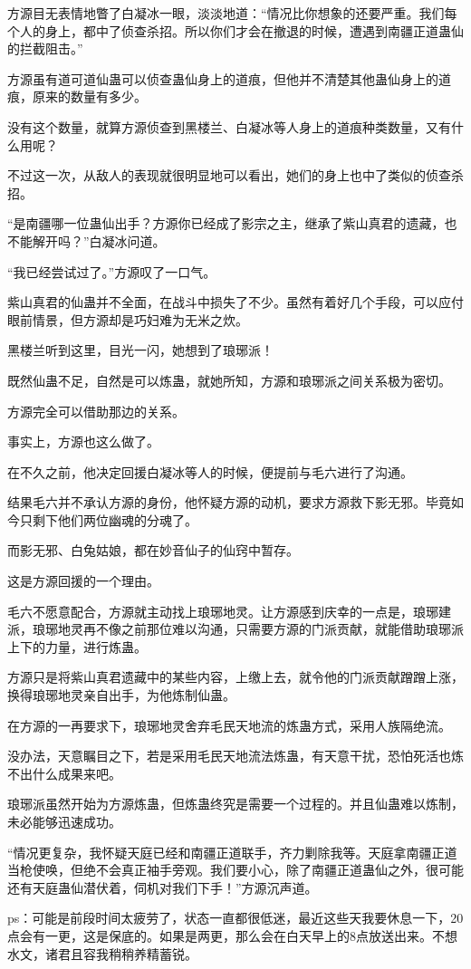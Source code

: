 \begin{this_body}
方源目无表情地瞥了白凝冰一眼，淡淡地道：“情况比你想象的还要严重。我们每个人的身上，都中了侦查杀招。所以你们才会在撤退的时候，遭遇到南疆正道蛊仙的拦截阻击。”

方源虽有道可道仙蛊可以侦查蛊仙身上的道痕，但他并不清楚其他蛊仙身上的道痕，原来的数量有多少。

没有这个数量，就算方源侦查到黑楼兰、白凝冰等人身上的道痕种类数量，又有什么用呢？

不过这一次，从敌人的表现就很明显地可以看出，她们的身上也中了类似的侦查杀招。

“是南疆哪一位蛊仙出手？方源你已经成了影宗之主，继承了紫山真君的遗藏，也不能解开吗？”白凝冰问道。

“我已经尝试过了。”方源叹了一口气。

紫山真君的仙蛊并不全面，在战斗中损失了不少。虽然有着好几个手段，可以应付眼前情景，但方源却是巧妇难为无米之炊。

黑楼兰听到这里，目光一闪，她想到了琅琊派！

既然仙蛊不足，自然是可以炼蛊，就她所知，方源和琅琊派之间关系极为密切。

方源完全可以借助那边的关系。

事实上，方源也这么做了。

在不久之前，他决定回援白凝冰等人的时候，便提前与毛六进行了沟通。

结果毛六并不承认方源的身份，他怀疑方源的动机，要求方源救下影无邪。毕竟如今只剩下他们两位幽魂的分魂了。

而影无邪、白兔姑娘，都在妙音仙子的仙窍中暂存。

这是方源回援的一个理由。

毛六不愿意配合，方源就主动找上琅琊地灵。让方源感到庆幸的一点是，琅琊建派，琅琊地灵再不像之前那位难以沟通，只需要方源的门派贡献，就能借助琅琊派上下的力量，进行炼蛊。

方源只是将紫山真君遗藏中的某些内容，上缴上去，就令他的门派贡献蹭蹭上涨，换得琅琊地灵亲自出手，为他炼制仙蛊。

在方源的一再要求下，琅琊地灵舍弃毛民天地流的炼蛊方式，采用人族隔绝流。

没办法，天意瞩目之下，若是采用毛民天地流法炼蛊，有天意干扰，恐怕死活也炼不出什么成果来吧。

琅琊派虽然开始为方源炼蛊，但炼蛊终究是需要一个过程的。并且仙蛊难以炼制，未必能够迅速成功。

“情况更复杂，我怀疑天庭已经和南疆正道联手，齐力剿除我等。天庭拿南疆正道当枪使唤，但绝不会真正袖手旁观。我们要小心，除了南疆正道蛊仙之外，很可能还有天庭蛊仙潜伏着，伺机对我们下手！”方源沉声道。

ps：可能是前段时间太疲劳了，状态一直都很低迷，最近这些天我要休息一下，20点会有一更，这是保底的。如果是两更，那么会在白天早上的8点放送出来。不想水文，诸君且容我稍稍养精蓄锐。

\end{this_body}

